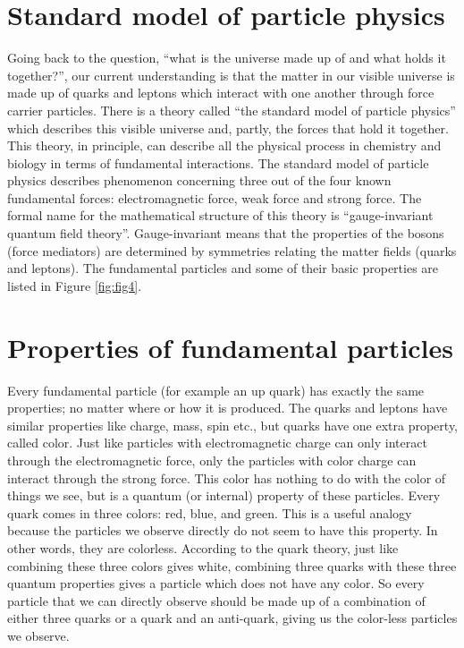  


\section{Standard model of particle physics}
Going back to the question, ``what is the universe made up of and what holds it together?'', 
our current understanding is that the matter in our visible universe is made up of quarks and leptons which interact with one another through force carrier particles.  There is a theory called ``the standard model of particle physics'' which describes this visible universe and, partly, the forces that hold it together. This theory, in principle, can describe all the physical process in chemistry and biology in terms of fundamental interactions. The standard model of particle physics describes phenomenon concerning three out of the four known 
fundamental forces: electromagnetic force, weak force and strong force. The formal name for the mathematical structure of this theory is “gauge-invariant quantum field theory”.  Gauge-invariant means that the properties of the bosons (force mediators) are determined by symmetries relating the matter fields (quarks and leptons). 
The fundamental particles and some of their basic properties are listed in 
Figure \ref{fig:fig4}.




\section{Properties of fundamental particles}
Every fundamental particle (for example an up quark) has exactly the same properties; no matter where or how it is produced. The quarks and leptons have similar properties like charge, mass, spin etc., but quarks have one extra property, called color. Just like particles with electromagnetic charge can only interact through the electromagnetic force, only the particles with color charge can interact through the strong force. This color has nothing to do with the color of things we see, but is a quantum (or internal) property of these particles. Every quark comes in three colors: red, blue, and green. This is a useful analogy because the particles we observe directly do not seem to have this property. In other words, they are colorless. According to the quark theory, just like combining these three colors gives white, combining three quarks with these three quantum properties gives a particle which does not have any color. So every particle that we can directly observe should be made up of a combination of either three quarks or a quark and an anti-quark, giving us the color-less particles we observe. 

